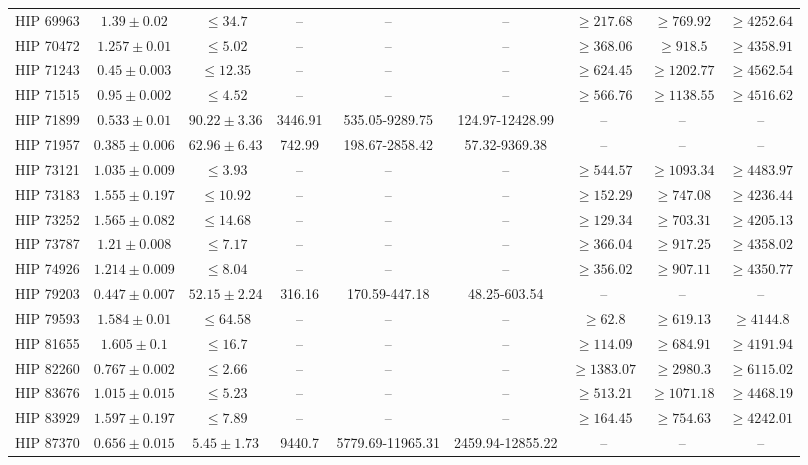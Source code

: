 {\begin{longtable}{|c|c|c|c|c|c|c|c|c|}
HIP 69963 & $ 1.39 \pm 0.02 $ & $\le 34.7 $ &-- &-- &-- & $\ge 217.68 $ & $\ge 769.92 $ & $\ge 4252.64 $ \\
HIP 70472 & $ 1.257 \pm 0.01 $ & $\le 5.02 $ &-- &-- &-- & $\ge 368.06 $ & $\ge 918.5 $ & $\ge 4358.91 $ \\
HIP 71243 & $ 0.45 \pm 0.003 $ & $\le 12.35 $ &-- &-- &-- & $\ge 624.45 $ & $\ge 1202.77 $ & $\ge 4562.54 $ \\
HIP 71515 & $ 0.95 \pm 0.002 $ & $\le 4.52 $ &-- &-- &-- & $\ge 566.76 $ & $\ge 1138.55 $ & $\ge 4516.62 $ \\
HIP 71899 & $ 0.533 \pm 0.01 $ & $ 90.22 \pm 3.36 $ & 3446.91 & 535.05-9289.75 & 124.97-12428.99 &-- &-- &-- \\
HIP 71957 & $ 0.385 \pm 0.006 $ & $ 62.96 \pm 6.43 $ & 742.99 & 198.67-2858.42 & 57.32-9369.38 &-- &-- &-- \\
HIP 73121 & $ 1.035 \pm 0.009 $ & $\le 3.93 $ &-- &-- &-- & $\ge 544.57 $ & $\ge 1093.34 $ & $\ge 4483.97 $ \\
HIP 73183 & $ 1.555 \pm 0.197 $ & $\le 10.92 $ &-- &-- &-- & $\ge 152.29 $ & $\ge 747.08 $ & $\ge 4236.44 $ \\
HIP 73252 & $ 1.565 \pm 0.082 $ & $\le 14.68 $ &-- &-- &-- & $\ge 129.34 $ & $\ge 703.31 $ & $\ge 4205.13 $ \\
HIP 73787 & $ 1.21 \pm 0.008 $ & $\le 7.17 $ &-- &-- &-- & $\ge 366.04 $ & $\ge 917.25 $ & $\ge 4358.02 $ \\
HIP 74926 & $ 1.214 \pm 0.009 $ & $\le 8.04 $ &-- &-- &-- & $\ge 356.02 $ & $\ge 907.11 $ & $\ge 4350.77 $ \\
HIP 79203 & $ 0.447 \pm 0.007 $ & $ 52.15 \pm 2.24 $ & 316.16 & 170.59-447.18 & 48.25-603.54 &-- &-- &-- \\
HIP 79593 & $ 1.584 \pm 0.01 $ & $\le 64.58 $ &-- &-- &-- & $\ge 62.8 $ & $\ge 619.13 $ & $\ge 4144.8 $ \\
HIP 81655 & $ 1.605 \pm 0.1 $ & $\le 16.7 $ &-- &-- &-- & $\ge 114.09 $ & $\ge 684.91 $ & $\ge 4191.94 $ \\
HIP 82260 & $ 0.767 \pm 0.002 $ & $\le 2.66 $ &-- &-- &-- & $\ge 1383.07 $ & $\ge 2980.3 $ & $\ge 6115.02 $ \\
HIP 83676 & $ 1.015 \pm 0.015 $ & $\le 5.23 $ &-- &-- &-- & $\ge 513.21 $ & $\ge 1071.18 $ & $\ge 4468.19 $ \\
HIP 83929 & $ 1.597 \pm 0.197 $ & $\le 7.89 $ &-- &-- &-- & $\ge 164.45 $ & $\ge 754.63 $ & $\ge 4242.01 $ \\
HIP 87370 & $ 0.656 \pm 0.015 $ & $ 5.45 \pm 1.73 $ & 9440.7 & 5779.69-11965.31 & 2459.94-12855.22 &-- &-- &-- \\

\end{longtable}}
